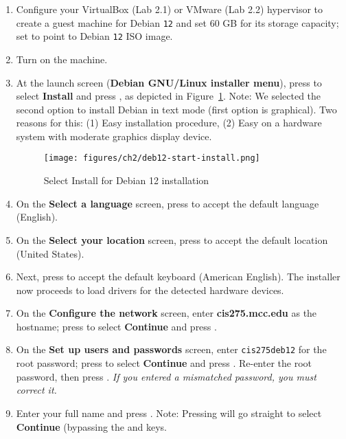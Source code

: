 \begin{enumerate}
\item Configure your VirtualBox (Lab 2.1) or VMware (Lab 2.2) hypervisor to create a guest machine for Debian {\tt{12}} and set 60 GB for its storage capacity; set to point to Debian {\tt{12}} ISO image. 

\item Turn on the machine. 

\item At the launch screen ({\bf{Debian GNU/Linux installer menu}}), press {\keys{$\downarrow$}} to select {\bf{Install}} and press {}, as depicted in Figure~\ref{fig:deb12-start-install}. Note: We selected the second option to install Debian in text mode (first option is graphical). Two reasons for this: (1) Easy installation procedure, (2) Easy on a hardware system with moderate graphics display device. 

\begin{figure}[hbt!]\centering
   \texttt{[image: figures/ch2/deb12-start-install.png]}
   \caption{Select Install for Debian 12 installation} \label{fig:deb12-start-install} %
\end{figure}

\item On the {\bf{Select a language}} screen, press {} to accept the default language (English). 

\item On the {\bf{Select your location}} screen, press {} to accept the default location (United States). 

\item Next, press {} to accept the default keyboard (American English). The installer now proceeds to load drivers for the detected hardware devices. 

\item On the {\bf{Configure the network}} screen, enter {\bf{cis275.mcc.edu}} as the hostname; press {} to select {\bf{Continue}} and press {}. 

\item On the {\bf{Set up users and passwords}} screen, enter {\tt{cis275deb12}} for the root password; press {} to select {\bf{Continue}} and press {}. Re-enter the root password, then press {}. {\it{If you entered a mismatched password, you must correct it.}}

\item Enter your full name and press {}. Note: Pressing {} will go straight to select {\bf{Continue}} (bypassing the {} and {} keys. 


\end{enumerate}
